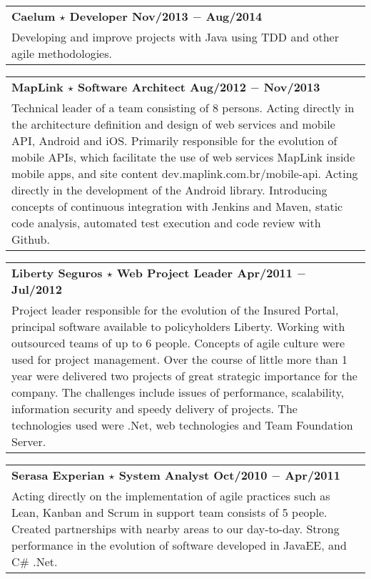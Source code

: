 \documentclass[a4paper, oneside, final]{scrartcl}
\newcommand{\vspc}{\vspace{0.15cm}} %
\begin{document}
\begin{center}
\begin{tabularx}{1\linewidth}{X}
{\bf Caelum $\star$ Developer \hfill Nov/2013 $-$ Aug/2014} \\
Developing and improve projects with Java using TDD and other agile methodologies. \vspc\\
\end{tabularx}

\begin{tabularx}{1\linewidth}{X}
{\bf MapLink $\star$ Software Architect \hfill Aug/2012 $-$ Nov/2013} \\
Technical leader of a team consisting of 8 persons. Acting directly in the architecture definition and design of web services and mobile API, Android and iOS. Primarily responsible for the evolution of mobile APIs, which facilitate the use of web services MapLink inside mobile apps, and site content dev.maplink.com.br/mobile-api. Acting directly in the development of the Android library. Introducing concepts of continuous integration with Jenkins and Maven, static code analysis, automated test execution and code review with Github. \vspc\\
\end{tabularx}

\begin{tabularx}{1\linewidth}{X}
{\bf Liberty Seguros $\star$ Web Project Leader \hfill Apr/2011 $-$ Jul/2012} \\
Project leader responsible for the evolution of the Insured Portal, principal software available to policyholders Liberty. Working with outsourced teams of up to 6 people. Concepts of agile culture were used for project management. Over the course of little more than 1 year were delivered two projects of great strategic importance for the company. The challenges include issues of performance, scalability, information security and speedy delivery of projects. The technologies used were .Net, web technologies and Team Foundation Server. \vspc\\
\end{tabularx}

\begin{tabularx}{1\linewidth}{X}
{\bf Serasa Experian $\star$  System Analyst \hfill Oct/2010 $-$ Apr/2011} \\
Acting directly on the implementation of agile practices such as Lean, Kanban and Scrum in support team consists of 5 people. Created partnerships with nearby areas to our day-to-day. Strong performance in the evolution of software developed in JavaEE, and C\# .Net. \vspc\\
\end{tabularx}


\end{center}
\end{document}
